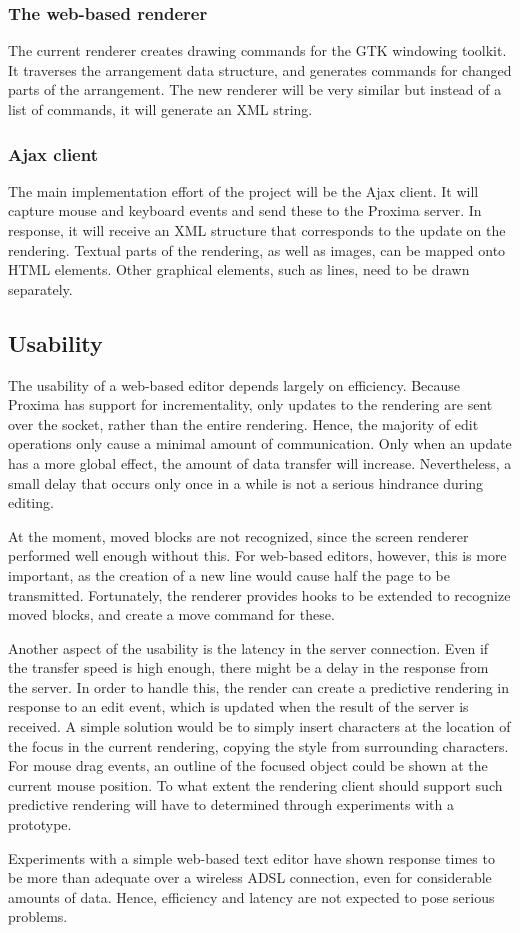 \documentclass[10pt]{article}
\begin{document}
\subsubsection{The web-based renderer}

The current renderer creates drawing commands for the GTK windowing toolkit. It traverses the arrangement data structure, and generates commands for changed parts of the arrangement. The new renderer will be very similar but instead of a list of commands, it will generate an XML string.

\subsubsection{Ajax client}

The main implementation effort of the project will be the Ajax client. It will capture mouse and keyboard events and send these to the Proxima server. In response, it will receive an XML structure that corresponds to the update on the rendering. Textual parts of the rendering, as well as images, can be mapped onto HTML elements. Other graphical elements, such as lines, need to be drawn separately.

\subsection{Usability}

The usability of a web-based editor depends largely on efficiency. Because Proxima has support for incrementality, only updates to the rendering are sent over the socket, rather than the entire rendering. Hence, the majority of edit operations only cause a minimal amount of communication. Only when an update has a more global effect, the amount of data transfer will increase. Nevertheless, a small delay that occurs only once in a while is not a serious hindrance during editing. 

\bc
At the moment, moved blocks are not recognized, since the screen renderer performed well enough without this. For web-based editors, however, this is more important, as the creation of a new line would cause half the page to be transmitted. Fortunately, the renderer provides hooks to be extended to recognize moved blocks, and create a move command for these.
\ec

Another aspect of the usability is the latency in the server connection. Even if the transfer speed is high enough, there might be a delay in the response from the server. \bc In order to handle this, the render can create a predictive rendering in response to an edit event, which is updated when the result of the server is received. \ec A simple solution would be to simply insert characters at the location of the focus in the current rendering, copying the style from surrounding characters. For mouse drag events, an outline of the focused object could be shown at the current mouse position. To what extent the rendering client should support such predictive rendering will have to determined through experiments with a prototype.

Experiments with a simple web-based text editor have shown response times to be more than adequate over a wireless ADSL connection, even for considerable amounts of data. Hence, efficiency and latency are not expected to pose serious problems. 




\end{document}
